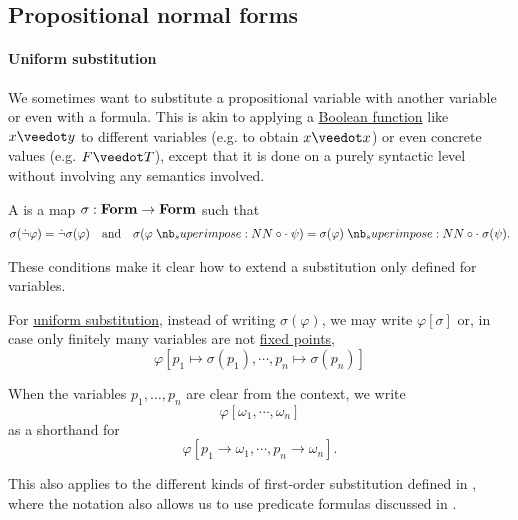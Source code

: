 \subsection{Propositional normal forms}\label{subsec:propositional_normal_forms}

\paragraph{Uniform substitution}\hfill

We sometimes want to substitute a propositional variable with another variable or even with a formula. This is akin to applying a \hyperref[def:boolean_function]{Boolean function} like \( x \synvee y \) to different variables (e.g. to obtain \( x \synvee x \)) or even concrete values (e.g. \( F \synvee T \)), except that it is done on a purely syntactic level without involving any semantics involved.

\begin{definition}\label{def:uniform_propositional_substitution}
  A  is a map \( \sigma: \op*{Form} \to \op*{Form} \) such that
  \begin{align*}
    \sigma(\synneg \varphi) = \synneg \sigma(\varphi) &&\T{and}&& \sigma(\varphi \syncirc \psi) = \sigma(\varphi) \syncirc \sigma(\psi).
  \end{align*}

  These conditions make it clear how to extend a substitution only defined for variables.
\end{definition}

\begin{remark}\label{rem:uniform_substitution_notation}
  For \hyperref[def:uniform_propositional_substitution]{uniform substitution}, instead of writing \( \sigma(\varphi) \), we may write \( \varphi[\sigma] \) or, in case only finitely many variables are not \hyperref[def:fixed_point]{fixed points},
  \begin{equation*}
    \varphi[p_1 \mapsto \sigma(p_1), \cdots, p_n \mapsto \sigma(p_n)]
  \end{equation*}

  When the variables \( p_1, \ldots, p_n \) are clear from the context, we write
  \begin{equation*}
    \varphi[\omega_1, \cdots, \omega_n]
  \end{equation*}
  as a shorthand for
  \begin{equation*}
    \varphi[p_1 \to \omega_1, \cdots, p_n \to \omega_n].
  \end{equation*}

  This also applies to the different kinds of first-order substitution defined in , where the notation also allows us to use predicate formulas discussed in .
\end{remark}


